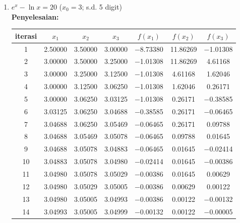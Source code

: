 \documentclass{article}
\newcommand{\penyelesaian}{\textbf{Penyelesaian: }}
\begin{document}
\begin{enumerate}
\begin{enumerate}
        \item $e^x - \ln{x} = 20$ ($x_0 = \num{3}$; s.d. 5 digit) \\ 
        \penyelesaian \\
        \begin{tabular}{|c|c|c|c|c|c|c|}
            \hline
            iterasi & $x_1$ & $x_2$ & $x_3$ & $f(x_1)$ & $f(x_2)$ & $f(x_3)$ \\
            \hline
            1 & \num{2,50000} & \num{3,50000} & \num{3,00000} & \num{-8,73380} & \num{11,86269} & \num{-1,01308}\\
            2 & \num{3,00000} & \num{3,50000} & \num{3,25000} & \num{-1,01308} & \num{11,86269} & \num{4,61168}\\
            3 & \num{3,00000} & \num{3,25000} & \num{3,12500} & \num{-1,01308} & \num{4,61168} & \num{1,62046}\\
            4 & \num{3,00000} & \num{3,12500} & \num{3,06250} & \num{-1,01308} & \num{1,62046} & \num{0,26171}\\
            5 & \num{3,00000} & \num{3,06250} & \num{3,03125} & \num{-1,01308} & \num{0,26171} & \num{-0,38585}\\
            6 & \num{3,03125} & \num{3,06250} & \num{3,04688} & \num{-0,38585} & \num{0,26171} & \num{-0,06465}\\
            7 & \num{3,04688} & \num{3,06250} & \num{3,05469} & \num{-0,06465} & \num{0,26171} & \num{0,09788}\\
            8 & \num{3,04688} & \num{3,05469} & \num{3,05078} & \num{-0,06465} & \num{0,09788} & \num{0,01645}\\
            9 & \num{3,04688} & \num{3,05078} & \num{3,04883} & \num{-0,06465} & \num{0,01645} & \num{-0,02414}\\
            10 & \num{3,04883} & \num{3,05078} & \num{3,04980} & \num{-0,02414} & \num{0,01645} & \num{-0,00386}\\
            11 & \num{3,04980} & \num{3,05078} & \num{3,05029} & \num{-0,00386} & \num{0,01645} & \num{0,00629}\\
            12 & \num{3,04980} & \num{3,05029} & \num{3,05005} & \num{-0,00386} & \num{0,00629} & \num{0,00122}\\
            13 & \num{3,04980} & \num{3,05005} & \num{3,04993} & \num{-0,00386} & \num{0,00122} & \num{-0,00132}\\
            14 & \num{3,04993} & \num{3,05005} & \num{3,04999} & \num{-0,00132} & \num{0,00122} & \num{-0,00005}\\

\end{tabular}
\end{enumerate}
\end{enumerate}
\end{document}
